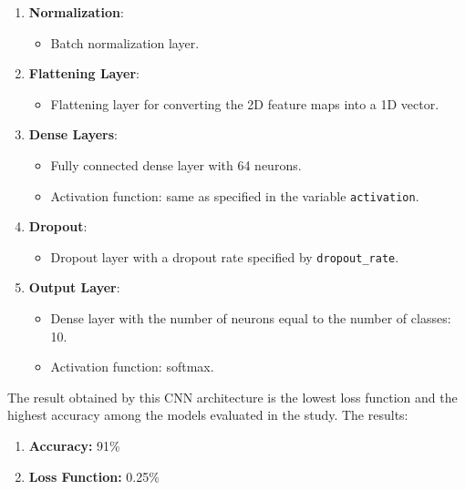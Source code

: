 \documentclass{article}
\begin{document}
\begin{enumerate}
    \item \textbf{Normalization}:
          \begin{itemize}
              \item Batch normalization layer.
          \end{itemize}

    \item \textbf{Flattening Layer}:
          \begin{itemize}
              \item Flattening layer for converting the 2D feature maps into a 1D vector.
          \end{itemize}

    \item \textbf{Dense Layers}:
          \begin{itemize}
              \item Fully connected dense layer with 64 neurons.
              \item Activation function: same as specified in the variable \texttt{activation}.
          \end{itemize}

    \item \textbf{Dropout}:
          \begin{itemize}
              \item Dropout layer with a dropout rate specified by \texttt{dropout\_rate}.
          \end{itemize}

    \item \textbf{Output Layer}:
          \begin{itemize}
              \item Dense layer with the number of neurons equal to the number of classes: 10.
              \item Activation function: softmax.
          \end{itemize}
\end{enumerate}

The result obtained by this CNN architecture is the lowest loss function and the highest accuracy among the models evaluated in the study.
The results:
\begin{enumerate}
    \item \textbf{Accuracy: } 91\%
        
    \item \textbf{Loss Function: } 0.25\%

\end{enumerate}
\end{document}

